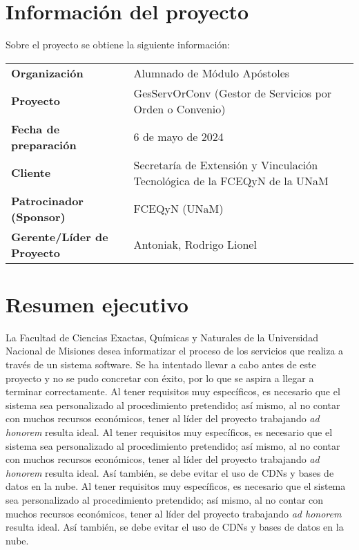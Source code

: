 \section[Definici\'on]{Informaci\'on del proyecto}
\normalsize{ \indent
Sobre el proyecto se obtiene la siguiente informaci\'on:
}
\begin{center}
\begin{tabular}{ p{5.5cm} p{10cm} }
	\textbf{Organizaci\'on} & Alumnado de M\'odulo Ap\'ostoles \\
	\textbf{Proyecto} & GesServOrConv (Gestor de Servicios por
		Orden o Convenio) \\
	\textbf{Fecha de preparaci\'on} & 6 de mayo de 2024 \\
	\textbf{Cliente} & Secretar\'ia de Extensi\'on y
		Vinculaci\'on Tecnol\'ogica de la FCEQyN de la UNaM \\
	\textbf{Patrocinador (Sponsor)} & FCEQyN (UNaM) \\
	\textbf{Gerente/L\'ider de Proyecto} & Antoniak, Rodrigo
		Lionel
\end{tabular}
\end{center}
\section[Resumen]{Resumen ejecutivo}
\normalsize{ \indent
La Facultad de Ciencias Exactas, Qu\'imicas y Naturales de la
Universidad Nacional de Misiones desea informatizar el proceso
de los servicios que realiza a trav\'es de un sistema software.
Se ha intentado llevar a cabo antes de este proyecto y no
se pudo concretar con \'exito, por lo que se aspira a llegar
a terminar correctamente.
}
\newline
\normalsize{ \indent
Al tener requisitos muy espec\'ificos, es necesario que el
sistema sea personalizado al procedimiento pretendido; as\'i
mismo, al no contar con muchos recursos econ\'omicos, tener
al l\'ider del proyecto trabajando \textit{ad honorem}
resulta ideal.
}
\newline
\normalsize{ \indent
Al tener requisitos muy espec\'ificos, es necesario que el
sistema sea personalizado al procedimiento pretendido; as\'i
mismo, al no contar con muchos recursos econ\'omicos, tener
al l\'ider del proyecto trabajando \textit{ad honorem}
resulta ideal. As\'i tambi\'en, se debe evitar el uso de CDNs
y bases de datos en la nube.
}
\newline
\normalsize{ \indent
Al tener requisitos muy espec\'ificos, es necesario que el
sistema sea personalizado al procedimiento pretendido; as\'i
mismo, al no contar con muchos recursos econ\'omicos, tener
al l\'ider del proyecto trabajando \textit{ad honorem}
resulta ideal. As\'i tambi\'en, se debe evitar el uso de CDNs
y bases de datos en la nube.
}
